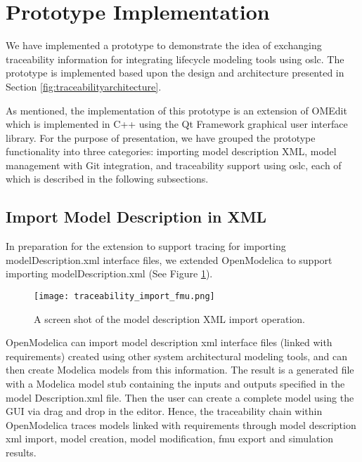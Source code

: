 \section{Prototype Implementation}
\label{sec:tracaebilityprototype}

We have implemented a prototype to demonstrate the idea of exchanging traceability information for
integrating lifecycle modeling tools using \acrshort{oslc}. The prototype is implemented based upon the design and
architecture presented in Section \ref{fig:traceabilityarchitecture}.

As mentioned, the implementation of this prototype is an extension of OMEdit which
is implemented in C++ using the Qt Framework graphical user interface library. For the purpose of presentation, we have grouped the prototype functionality into three categories: importing model description XML, model management with Git integration, and traceability support using \acrshort{oslc}, 
each of which is described in the following subsections.


\subsection{Import Model Description in XML}
\label{ssec:tracaebilityimprtxml}

In preparation for the extension to support tracing for importing modelDescription.xml interface files, we 
extended OpenModelica to support importing modelDescription.xml (See Figure \ref{fig:traceabilityimportfmu}). 

\begin{figure}
	\texttt{[image: traceability\_import\_fmu.png]}
	\caption{A screen shot of the model description XML import operation.}
	\label{fig:traceabilityimportfmu}
\end{figure}

OpenModelica can import model description \acrshort{xml} interface files (linked with requirements) created using
other system architectural modeling tools, and can then create Modelica models from this information. The result is a
generated file with a Modelica model stub containing the inputs and outputs specified in the model
Description.xml file. Then the user can create a complete model using the GUI via drag and drop in the
editor. Hence, the traceability chain within OpenModelica traces models linked with requirements
through model description \acrshort{xml} import, model creation, model modification, \acrshort{fmu} export and simulation results.


